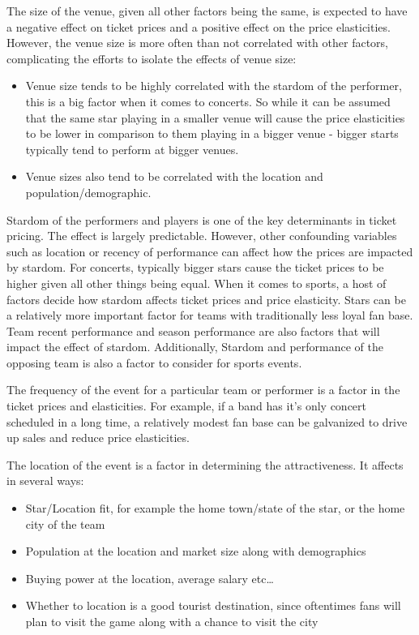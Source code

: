 \documentclass[letterpaper, 12pt]{article}
\begin{document}
 The size of the venue, given all other factors being the same, is expected to have a negative effect on ticket prices and a positive effect on the price elasticities. However, the venue size is more often than not correlated with other factors, complicating the efforts to isolate the effects of venue size:
\begin{itemize}\itemsep0em
	\item Venue size tends to be highly correlated with the stardom of the performer, this is a big factor when it comes to concerts. So while it can be assumed that the same star playing in a smaller venue will cause the price elasticities to be lower in comparison to them playing in a bigger venue - bigger starts typically tend to perform at bigger venues.
	\item Venue sizes also tend to be correlated with the location and population/demographic.
\end{itemize}

 Stardom of the performers and players is one of the key determinants in ticket pricing. The effect is largely predictable. However, other confounding variables such as location or recency of performance can affect how the prices are impacted by stardom. For concerts, typically bigger stars cause the ticket prices to be higher given all other things being equal. When it comes to sports, a host of factors decide how stardom affects ticket prices and price elasticity. Stars can be a relatively more important factor for teams with traditionally less loyal fan base. Team recent performance and season performance are also factors that will impact the effect of stardom. Additionally, Stardom and performance of the opposing team is also a factor to consider for sports events.

 The frequency of the event for a particular team or performer is a factor in the ticket prices and elasticities. For example, if a band has it's only concert scheduled in a long time, a relatively modest fan base can be galvanized to drive up sales and reduce price elasticities.

 The location of the event is a factor in determining the attractiveness. It affects in several ways:
\begin{itemize}\itemsep0em
	\item Star/Location fit, for example the home town/state of the star, or the home city of the team
	\item Population at the location and market size along with demographics
	\item Buying power at the location, average salary etc\dots
	\item Whether to location is a good tourist destination, since oftentimes fans will plan to visit the game along with a chance to visit the city
\end{itemize}
\end{document}

